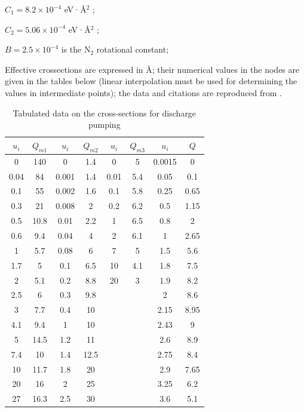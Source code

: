 \documentclass{report}
\begin{document}
$C_1 = 8.2 \times 10^{-4}$ eV·Å$^2$ \cite{Hake-1967};

$C_2 = 5.06 \times 10^{-4}$ eV·Å$^2$ \cite{Frost-1962};

$B = 2.5 \times 10^{-4}$ is the N$_2$ rotational constant;

Effective crossections are expressed in Å; their numerical values in the nodes are given in the tables below (linear interpolation must be used for determining the values in intermediate points); the data and citations are reproduced from \cite{Karlov-1978}.

\begin{table}
\centering
\caption{Tabulated data on the cross-sections for discharge pumping}
\begin{tabular}{|c|c||c|c||c|c||c|c|}
\hline 
$u_i$ & $Q_{m1}$ & $u_i$ & $Q_{m2}$ & $u_i$ & $Q_{m3}$ & $u_i$ & $Q$ \\ 
\hline
0    & 140  & 0     & 1.4  & 0    & 5   & 0.0015 & 0    \\
0.04 & 84   & 0.001 & 1.4  & 0.01 & 5.4 & 0.05   & 0.1  \\
0.1  & 55   & 0.002 & 1.6  & 0.1  & 5.8 & 0.25   & 0.65 \\
0.3  & 21   & 0.008 & 2    & 0.2  & 6.2 & 0.5    & 1.15 \\
0.5  & 10.8 & 0.01  & 2.2  & 1    & 6.5 & 0.8    & 2    \\
0.6  & 9.4  & 0.04  & 4    & 2    & 6.1 & 1      & 2.65 \\
1    & 5.7  & 0.08  & 6    & 7    & 5   & 1.5    & 5.6  \\
1.7  & 5    & 0.1   & 6.5  & 10   & 4.1 & 1.8    & 7.5  \\
2    & 5.1  & 0.2   & 8.8  & 20   & 3   & 1.9    & 8.2  \\
2.5  & 6    & 0.3   & 9.8  &      &     & 2      & 8.6  \\
3    & 7.7  & 0.4   & 10   &      &     & 2.15   & 8.95 \\
4.1  & 9.4  & 1     & 10   &      &     & 2.43   & 9    \\
5    & 14.5 & 1.2   & 11   &      &     & 2.6    & 8.9  \\
7.4  & 10   & 1.4   & 12.5 &      &     & 2.75   & 8.4  \\
10   & 11.7 & 1.8   & 20   &      &     & 2.9    & 7.65 \\
20   & 16   & 2     & 25   &      &     & 3.25   & 6.2  \\
27   & 16.3 & 2.5   & 30   &      &     & 3.6    & 5.1  \\

\end{tabular}
\end{table}
\end{document}

